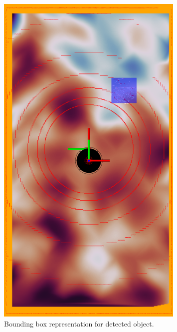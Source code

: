 \begin{figure}[H]
\begin{minipage}{0.45\textwidth}
        \includegraphics[width=0.8\textwidth]{figs/bbox.png}
        \caption{Bounding box representation for detected object.}
        \label{fig:bbox}
    \end{minipage}
\label{fig:results}
\end{figure}

